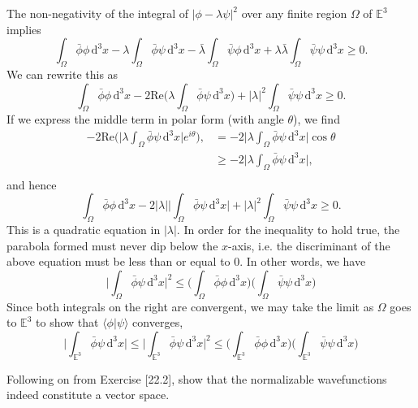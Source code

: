 \documentclass[../road-to-reality.tex]{subfiles}
\begin{document}
\begin{questions}
\begin{solution}
	The non-negativity of the integral of $|\phi - \lambda\psi|^2$ over any finite region $\Omega$ of $\mathbb{E}^3$ implies
	\[
		\int_{\Omega}\bar{\phi}\phi\,\mathrm{d}^3x - \lambda\int_{\Omega}\bar{\phi}\psi\,\mathrm{d}^3x - \bar{\lambda}\int_{\Omega}\bar{\psi}\phi\,\mathrm{d}^3x + \lambda\bar{\lambda}\int_{\Omega}\bar{\psi}\psi\,\mathrm{d}^3x \geq 0.
	\]
	We can rewrite this as
	\[
		\int_{\Omega}\bar{\phi}\phi\,\mathrm{d}^3x - 2\mathrm{Re}\Big(\lambda\int_{\Omega}\bar{\phi}\psi\,\mathrm{d}^3x\Big) + |\lambda|^2\int_{\Omega}\bar{\psi}\psi\,\mathrm{d}^3x \geq 0.
	\]
	If we express the middle term in polar form (with angle $\theta$), we find
	\begin{align*}
		 {-2}\mathrm{Re}\Big(\Big|\lambda\int_{\Omega}\bar{\phi}\psi\,\mathrm{d}^3x\Big|e^{i\theta}\Big), &= {-2}\Big|\lambda\int_{\Omega}\bar{\phi}\psi\,\mathrm{d}^3x\Big|\cos\theta \\ &\geq {-2}\Big|\lambda\int_{\Omega}\bar{\phi}\psi\,\mathrm{d}^3x\Big|,\\
	\end{align*}
	and hence
	\[
		\int_{\Omega}\bar{\phi}\phi\,\mathrm{d}^3x - 2|\lambda|\Big|\int_{\Omega}\bar{\phi}\psi\,\mathrm{d}^3x\Big| + |\lambda|^2\int_{\Omega}\bar{\psi}\psi\,\mathrm{d}^3x \geq 0.
	\]
	This is a quadratic equation in $|\lambda|$. In order for the inequality to hold true, the parabola formed must never dip below the $x$-axis, i.e. the discriminant of the above equation must be less than or equal to $0$. In other words, we have
	\[
		\Big|\int_{\Omega}\bar{\phi}\psi\,\mathrm{d}^3x\Big|^2 \leq \Big(\int_{\Omega}\bar{\phi}\phi\,\mathrm{d}^3x\Big)\Big(\int_{\Omega}\bar{\psi}\psi\,\mathrm{d}^3x\Big)
	\]
	Since both integrals on the right are convergent, we may take the limit as $\Omega$ goes to $\mathbb{E}^3$ to show that $\langle\phi|\psi\rangle$ converges,
	\[
	\Big|\int_{\mathbb{E}^3}\bar{\phi}\psi\,\mathrm{d}^3x\Big| \leq \Big|\int_{\mathbb{E}^3}\bar{\phi}\psi\,\mathrm{d}^3x\Big|^2 \leq \Big(\int_{\mathbb{E}^3}\bar{\phi}\phi\,\mathrm{d}^3x\Big)\Big(\int_{\mathbb{E}^3}\bar{\psi}\psi\,\mathrm{d}^3x\Big)
	\]
\end{solution}

\question Following on from Exercise [22.2], show that the normalizable wavefunctions indeed constitute a vector space.


\end{questions}
\end{document}

